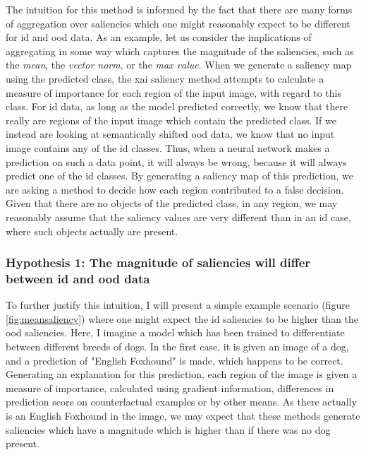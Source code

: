 \documentclass[UKenglish]{uiomasterthesis} %
\theoremstyle{definition}
\begin{document}
The intuition for this method is informed by the fact that there are many forms of aggregation over saliencies which one might reasonably expect to be different for \ac{id} and \ac{ood} data. As an example, let us consider the implications of aggregating in some way which captures the magnitude of the saliencies, such as the {\it mean}, the {\it vector norm}, or the {\it max value}. When we generate a saliency map using the predicted class, the \ac{xai} saliency method attempts to calculate a measure of importance for each region of the input image, with regard to this class. For \ac{id} data, as long as the model predicted correctly, we know that there really are regions of the input image which contain the predicted class. If we instead are looking at semantically shifted \ac{ood} data, we know that no input image contains any of the \ac{id} classes. Thus, when a neural network makes a prediction on such a data point, it will always be wrong, because it will always predict one of the \ac{id} classes. By generating a saliency map of this prediction, we are asking a method to decide how each region contributed to a false decision. Given that there are no objects of the predicted class, in any region, we may reasonably assume that the saliency values are very different than in an \ac{id} case, where such objects actually are present.

\subsubsection{Hypothesis 1: The magnitude of saliencies will differ between \ac{id} and \ac{ood} data}

To further justify this intuition, I will present a simple example scenario (figure \ref{fig:meansaliency}) where one might expect the \ac{id} saliencies to be higher than the \ac{ood} saliencies. Here, I imagine a model which has been trained to differentiate between different breeds of dogs. In the first case, it is given an image of a dog, and a prediction of "English Foxhound" is made, which happens to be correct. Generating an explanation for this prediction, each region of the image is given a measure of importance, calculated using gradient information, differences in prediction score on counterfactual examples or by other means. As there actually is an English Foxhound in the image, we may expect that these methods generate saliencies which have a magnitude which is higher than if there was no dog present.
\end{document}
